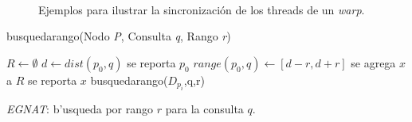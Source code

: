 \documentclass[letterpaper, 12pt]{article}
\begin{document}
\begin{figure}
\begin{center}
~~~~~~~~~~~~
\caption{\label{cod_gpu_sync}Ejemplos para ilustrar la sincronización
de los threads de un \emph{warp}.}
\end{center}
\end{figure}
	


\begin{algorithm}
busquedarango(Nodo \emph{P}, Consulta \emph{q}, Rango \emph{r})
\footnotesize{
\begin{algorithmic}[1]
\STATE {}
\STATE $R \leftarrow \emptyset$
\STATE $d \leftarrow dist(p_0,q)$
\STATE se reporta $p_0$
\ENDIF
\STATE $range(p_0,q)\leftarrow [d-r,d+r]$
\STATE se agrega $x$ a $R$
\STATE se reporta $x$
\ENDIF
\ENDIF
\ENDFOR
{}
\STATE busquedarango($D_{p_i}$,q,r)
\ENDFOR

\end{algorithmic}
}
\caption{\emph{\label{cap:ALGgnat:-b=FAsqueda-por-rango}EGNAT}: b'usqueda por
rango $r$ para la consulta $q$.}
\end{algorithm}
\end{document}
